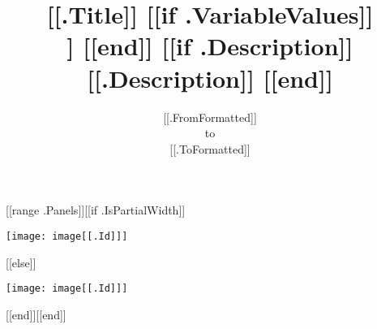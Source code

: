 \documentclass{article}
\begin{document}
\title{ \vspace{30mm} \sffamily \Huge [[.Title]] [[if .VariableValues]] \\ [[.VariableValues]] [[end]] [[if .Description]] \\
\vspace{0.5cm} \rmfamily \Large [[.Description]] [[end]]}
\date{[[.FromFormatted]]\vspace{0.25cm}\\to\\\vspace{0.25cm}[[.ToFormatted]]}
\maketitle
\thispagestyle{edbfooter}
\newpage
\begin{center}
\thispagestyle{edbheader}
[[range .Panels]][[if .IsPartialWidth]]\begin{minipage}{[[.Width]]\textwidth}
\texttt{[image: image[[.Id]]]}
\end{minipage}
[[else]]\par
\vspace{0.5cm}
\texttt{[image: image[[.Id]]]}
\par
\vspace{0.5cm}
[[end]][[end]]
\thispagestyle{edbheader}
\end{center}
\end{document}
